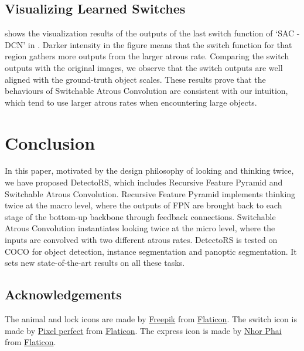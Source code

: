 \documentclass[final]{cvpr}
\begin{document}
\subsection{Visualizing Learned Switches}
 shows the visualization results of the outputs of the last switch function of `SAC - DCN' in .
Darker intensity in the figure means that the switch function for that region gathers more outputs from the larger atrous rate.
Comparing the switch outputs with the original images, we observe that the switch outputs are well aligned with the ground-truth object scales.
These results prove that the behaviours of Switchable Atrous Convolution are consistent with our intuition, which tend to use larger atrous rates when encountering large objects.
 \section{Conclusion}

In this paper, motivated by the design philosophy of looking and thinking twice, we have proposed DetectoRS, which includes Recursive Feature Pyramid and Switchable Atrous Convolution.
Recursive Feature Pyramid implements thinking twice at the macro level, where the outputs of FPN are brought back to each stage of the bottom-up backbone through feedback connections.
Switchable Atrous Convolution instantiates looking twice at the micro level, where the inputs are convolved with two different atrous rates.
DetectoRS is tested on COCO for object detection, instance segmentation and panoptic segmentation.
It sets new state-of-the-art results on all these tasks. 
{
\small
\subsection*{Acknowledgements}
\noindent The animal and lock icons are made by
\href{http://www.freepik.com/}{Freepik} from \href{https://www.flaticon.com/}{Flaticon}.
The switch icon is made by \href{https://www.flaticon.com/authors/pixel-perfect}{Pixel perfect} from \href{https://www.flaticon.com/}{Flaticon}.
The express icon is made by \href{https://www.flaticon.com/free-icon/conveyor_2897537}{Nhor Phai} from \href{https://www.flaticon.com/}{Flaticon}.
}

{\small


}
\end{document}
